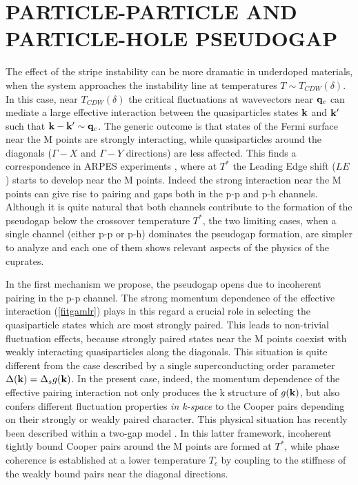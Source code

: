 \documentclass[twoside]{article}
\begin{document}
\section{PARTICLE-PARTICLE AND PAR\-TI\-CLE-HOLE PSEUDOGAP}

The effect of the stripe instability can be more dramatic in underdoped
materials, when the system approaches the instability line at temperatures
$T\sim T_{CDW}(\delta)$. In this case, near $T_{CDW}(\delta)$ the critical
fluctuations at
wavevectors near ${\bf q}_c$ can mediate a large effective interaction
between the quasiparticles states ${\bf k}$ and ${\bf k'}$
such that ${\bf k}-{\bf k'}\sim{\bf q}_c$. The generic outcome is that
states of the Fermi surface near the M points are strongly interacting, while
quasiparticles around the diagonals ($\Gamma-X$ and $\Gamma-Y$ directions)
are less affected. This finds a correspondence in ARPES experiments
\cite{marshall,ding}, where at $T^*$ the Leading Edge shift ($LE$) starts to
develop near the M points. Indeed the strong interaction near the M points
can give rise to pairing and gaps both in the p-p and p-h channels. Although
it is quite natural that both channels contribute to the formation of the
pseudogap below
the crossover temperature $T^*$, the two limiting cases, when a single
channel (either p-p or p-h) dominates the pseudogap formation, are simpler to
analyze and each one of them shows relevant aspects of the physics of the
cuprates.

In the first mechanism we propose, the pseudogap opens due to incoherent
pairing in the p-p channel. The strong momentum dependence of the effective
interaction (\ref{fitgamlr}) plays in this regard a crucial role in selecting
the quasiparticle states which are most strongly paired. This leads to
non-trivial fluctuation effects, because strongly paired states near the M
points coexist with weakly interacting quasiparticles along the diagonals.
This situation is quite different from the case described by a single
superconducting order parameter $\Delta ({\bf k})=\Delta_s g({\bf k})$. In
the present case, indeed, the momentum dependence of the effective pairing
interaction not only produces the k structure of $g({\bf k})$, but also
confers different fluctuation properties {\em in k-space} to the Cooper
pairs depending on their strongly or weakly paired character. This physical
situation has recently been described within a two-gap model \cite{twogap}.
In this latter framework, incoherent tightly bound Cooper pairs around the M
points are formed at $T^*$, while phase coherence is established at a lower
temperature $T_c$ by coupling to the stiffness of the weakly bound pairs near
the diagonal directions.
\end{document}
